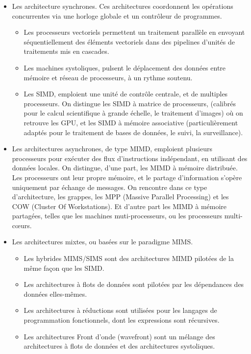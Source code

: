 \documentclass[a4paper,12pt]{report}
\theoremstyle{plain}				%
\theoremstyle{definition}				%
\newcommand{\lp}[1]{\todo[author=LP,color=yellow,inline]{#1}}
\begin{document}
\begin{itemize}
\item Les architecture synchrones.
  Ces architectures coordonnent les opérations concurrentes via une
  horloge globale et un contrôleur de programmes.
  \begin{itemize}
  \item Les processeurs
  vectoriels permettent un traitement parallèle en envoyant
  séquentiellement des éléments vectoriels dans des pipelines d'unités
  de traitements mis en cascades.
  \item Les machines systoliques,
  pulsent le déplacement des données entre mémoire et réseau de
  processeurs, à un rythme soutenu.
  \item Les SIMD, emploient une unité de contrôle centrale, et de
  multiples processeurs.
  On distingue les SIMD à matrice de processeurs, (calibrés pour le
  calcul scientifique à grande échelle, le traitement d'images) où on
  retrouve les GPU, et les SIMD à mémoire associative
  (particulièrement adaptés pour le traitement de bases de données, le
  suivi, la surveillance).
  \end{itemize}
\item Les architectures asynchrones, de type MIMD, emploient plusieurs
  processeurs pour exécuter des flux d'instructions indépendant, en
  utilisant des données locales.
  On distingue, d'une part, les MIMD à mémoire distribuée.
  Les processeurs ont leur propre mémoire, et le partage d'information
  s'opère uniquement par échange de messages.
  On rencontre dans ce type d'architecture, les grappes, les MPP
  (Massive Parallel Processing) et les COW (Cluster Of Workstations).
  Et d'autre part les MIMD à mémoire partagées, telles que les
  machines muti-processeurs, ou les processeurs multi-c\oe{}urs.
  \lp{Dire que c'est le contexte de ton travail ?}
\item Les architectures mixtes, ou basées sur le paradigme MIMS.
  \begin{itemize}
  \item Les hybrides MIMS/SIMS sont des architectures MIMD pilotées de
  la même façon que les SIMD.
  \item Les architectures à flots de données sont pilotées par les
  dépendances des données elles-mêmes.
  \item Les architectures à réductions sont utilisées pour les langages
  de programmation fonctionnels, dont les expressions sont récursives.
  \item Les architectures Front d'onde (wavefront) sont un mélange des
  architectures à flots de données et des architectures systoliques.
  \end{itemize}

\end{itemize}
\end{document}
